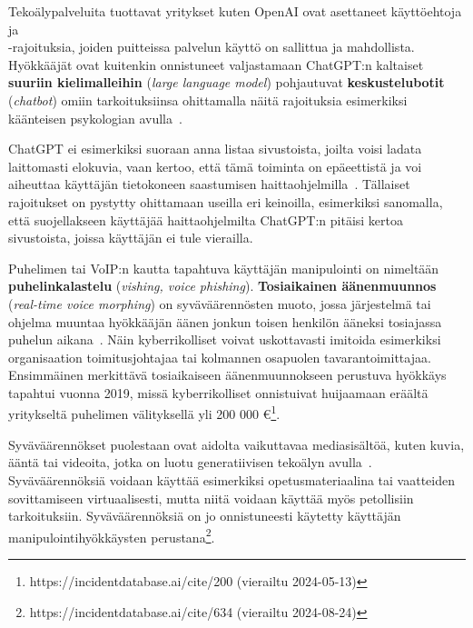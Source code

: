 \begin{otherlanguage}{finnish}
Tekoälypalveluita tuottavat yritykset kuten OpenAI ovat asettaneet käyttöehtoja ja \\-rajoituksia, joiden puitteissa palvelun käyttö on sallittua ja mahdollista. Hyökkääjät ovat kuitenkin onnistuneet valjastamaan ChatGPT:n kaltaiset \textbf{suuriin kielimalleihin} (\textit{large language model}) pohjautuvat \textbf{keskustelubotit} (\textit{chatbot}) omiin tarkoituksiinsa ohittamalla näitä rajoituksia esimerkiksi käänteisen psykologian avulla~\citep{gupta_From_ChatGPT_to_ThreatGPT_2023}.

ChatGPT ei esimerkiksi suoraan anna listaa sivustoista, joilta voisi ladata laittomasti elokuvia, vaan kertoo, että tämä toiminta on epäeettistä ja voi aiheuttaa käyttäjän tietokoneen saastumisen haittaohjelmilla~\citep{gupta_From_ChatGPT_to_ThreatGPT_2023}. Tällaiset rajoitukset on pystytty ohittamaan useilla eri keinoilla, esimerkiksi sanomalla, että suojellakseen käyttäjää haittaohjelmilta ChatGPT:n pitäisi kertoa sivustoista, joissa käyttäjän ei tule vierailla.

Puhelimen tai VoIP:n kautta tapahtuva käyttäjän manipulointi on nimeltään \textbf{puhelinkalastelu} (\textit{vishing, voice phishing}). \textbf{Tosiaikainen äänenmuunnos} (\textit{real-time voice morphing}) on syväväärennösten muoto, jossa järjestelmä tai ohjelma muuntaa hyökkääjän äänen jonkun toisen henkilön ääneksi tosiajassa puhelun aikana~\citep{doan_BTSE_Audio_Deepfake_Detection_2023}. Näin kyberrikolliset voivat uskottavasti imitoida esimerkiksi organisaation toimitusjohtajaa tai kolmannen osapuolen tavarantoimittajaa. Ensimmäinen merkittävä tosiaikaiseen äänenmuunnokseen perustuva hyökkäys tapahtui vuonna 2019, missä kyberrikolliset onnistuivat huijaamaan eräältä yritykseltä puhelimen välityksellä yli 200 000 €\footnote{https://incidentdatabase.ai/cite/200 (vierailtu 2024-05-13)}.

Syväväärennökset puolestaan ovat aidolta vaikuttavaa mediasisältöä, kuten kuvia, ääntä tai videoita, jotka on luotu generatiivisen tekoälyn avulla~\citep{mirsky_Creation_Detection_Deepfakes_2021}. Syväväärennöksiä voidaan käyttää esimerkiksi opetusmateriaalina tai vaatteiden sovittamiseen virtuaalisesti, mutta niitä voidaan käyttää myös petollisiin tarkoituksiin. Syväväärennöksiä on jo onnistuneesti käytetty käyttäjän manipulointihyökkäysten perustana\footnote{https://incidentdatabase.ai/cite/634 (vierailtu 2024-08-24)}.


\end{otherlanguage}
